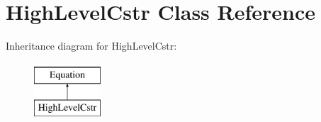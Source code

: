 \hypertarget{class_open_chams_1_1_high_level_cstr}{\section{High\-Level\-Cstr Class Reference}
\label{class_open_chams_1_1_high_level_cstr}
}
Inheritance diagram for High\-Level\-Cstr\-:\begin{figure}[H]
\begin{center}
\leavevmode
\includegraphics[height=2.000000cm]{class_open_chams_1_1_high_level_cstr}
\end{center}
\end{figure}

